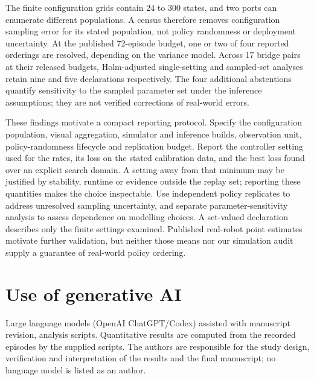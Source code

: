 \documentclass[pdflatex,iicol,sn-apa]{sn-jnl}
\theoremstyle{remark}
\begin{document}
The finite configuration grids contain 24 to 300 states, and two ports can enumerate different
populations. A census therefore removes configuration sampling error for its stated population,
not policy randomness or deployment uncertainty. At the published 72-episode budget, one or two
of four reported orderings are resolved, depending on the variance model. Across 17 bridge pairs
at their released budgets, Holm-adjusted single-setting and sampled-set analyses retain nine and
five declarations respectively. The four additional abstentions quantify sensitivity to the sampled
parameter set under the inference assumptions; they are not verified corrections of real-world errors.

These findings motivate a compact reporting protocol. Specify the configuration population, visual
aggregation, simulator and inference builds, observation unit, policy-randomness lifecycle and
replication budget. Report the controller setting used for the rates, its loss on the stated
calibration data, and the best loss found over an explicit search domain. A setting away from that
minimum may be justified by stability, runtime or evidence outside the replay set; reporting these
quantities makes the choice inspectable. Use independent policy replicates to address unresolved
sampling uncertainty, and separate parameter-sensitivity analysis to assess dependence on modelling
choices. A set-valued declaration describes only the finite settings examined. Published real-robot
point estimates motivate further validation, but neither those means nor our simulation audit supply
a guarantee of real-world policy ordering.

\section*{Use of generative AI}

Large language models (OpenAI ChatGPT/Codex) assisted with manuscript revision, analysis scripts. Quantitative results are computed from the recorded episodes by the supplied
scripts. The authors are responsible for the study design, verification and interpretation of the
results and the final manuscript; no language model is listed as an author.
\end{document}
